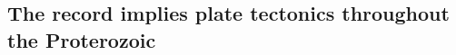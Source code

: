 \documentclass[11pt,letterpaper]{article}
\begin{document}
%
%


\subsection{The record implies plate tectonics throughout the Proterozoic}
\end{document}
